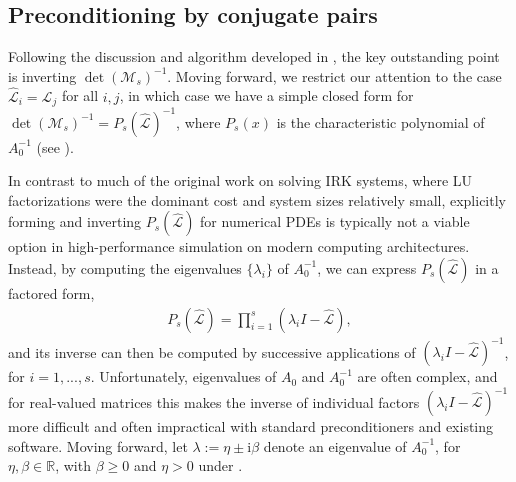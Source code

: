 \documentclass[review]{siamart}
\begin{document}
\subsection{Preconditioning by conjugate pairs}\label{sec:solve:prec}

Following the discussion and algorithm developed in , the key
outstanding point is inverting $\det(\mathcal{M}_s)^{-1}$. Moving forward, we
restrict our attention to the case $\widehat{\mathcal{L}}_i = \widehat{\mathcal{L}}_j$ for all $i,j$,
in which case we have a simple closed form for $\det(\mathcal{M}_s)^{-1} =
P_s(\widehat{\mathcal{L}})^{-1}$, where $P_s(x)$ is the characteristic polynomial
of $A_0^{-1}$ (see ).

In contrast to much of the original work on solving IRK systems, where LU factorizations
were the dominant cost and system sizes relatively small, explicitly forming and inverting
$P_s(\widehat{\mathcal{L}})$ for numerical PDEs is typically not a viable option in high-performance
simulation on modern computing architectures. Instead, by computing the eigenvalues
$\{\lambda_i\}$ of $A_0^{-1}$, we can express $P_s(\widehat{\mathcal{L}})$ in a factored form,
%
\begin{align}\label{eq:fac}
P_s(\widehat{\mathcal{L}}) = \prod_{i=1}^s (\lambda_i I - \widehat{\mathcal{L}}),
\end{align}
%
and its inverse can then be computed by successive applications of
$(\lambda_iI - \widehat{\mathcal{L}})^{-1}$,
for $i=1,...,s$. Unfortunately, eigenvalues of $A_0$ and $A_0^{-1}$ are often
complex, and for real-valued matrices this makes the inverse of individual factors
$(\lambda_iI - \widehat{\mathcal{L}})^{-1}$ more difficult and often impractical
with standard preconditioners and existing software. Moving forward, let
$\lambda := \eta \pm \mathrm{i}\beta$ denote an eigenvalue of $A_0^{-1}$,
for $\eta, \beta \in \mathbb{R}$, with $\beta \geq 0$ and $\eta > 0$ under .
\end{document}
